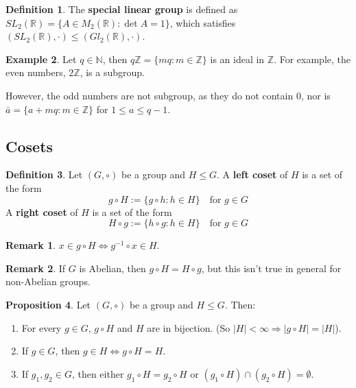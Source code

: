 \documentclass[12pt,a4paper]{article}
\theoremstyle{definition}
\newtheorem{definition}{Definition}[subsection]
\newtheorem{proposition}[definition]{Proposition}
\newtheorem{example}[definition]{Example}
\newtheorem*{remark}{Remark}
\begin{document}
\begin{definition}
	The \textbf{special linear group} is defined as $SL_2(\mathbb{R}) = \{ A \in M_2(\mathbb{R}): \det A = 1 \}$, which satisfies $(SL_2(\mathbb{R}), \cdot) \le (Gl_2(\mathbb{R}), \cdot)$.
\end{definition}

\begin{example}
	Let $q \in \mathbb{N}$, then $q \mathbb{Z} = \{ m q: m \in \mathbb{Z} \}$ is an ideal in $\mathbb{Z}$. For example, the even numbers, $2 \mathbb{Z}$, is a subgroup.

	However, the odd numbers are not subgroup, as they do not contain $0$, nor is $\bar{a} = \{ a + mq: m \in \mathbb{Z} \}$ for $1 \le a \le q - 1$.
\end{example}

\subsection{Cosets}

\begin{definition}
	Let $(G, \circ)$ be a group and $H \le G$. A \textbf{left coset} of $H$ is a set of the form
	\[
		g \circ H := \{ g \circ h: h \in H \} \quad \text{for } g \in G
	\]
	A \textbf{right coset} of $H$ is a set of the form
	\[
		H \circ g := \{ h \circ g: h \in H \} \quad \text{for } g \in G
	\]
\end{definition}

\begin{remark}
	$x \in g \circ H \Longleftrightarrow g^{-1} \circ x \in H$.
\end{remark}

\begin{remark}
	If $G$ is Abelian, then $g \circ H = H \circ g$, but this isn't true in general for non-Abelian groups.
\end{remark}

\begin{proposition}
	Let $(G, \circ)$ be a group and $H \le G$. Then:
	\begin{enumerate}
		\item For every $g \in G$, $g \circ H$ and $H$ are in bijection. (So $|H| < \infty \Rightarrow |g \circ H| = |H|$).
		\item If $g \in G$, then $g \in H \Longleftrightarrow g \circ H = H$.
		\item If $g_1, g_2 \in G$, then either $g_1 \circ H = g_2 \circ H$ or $(g_1 \circ H) \cap (g_2 \circ H) = \emptyset$.
	\end{enumerate}
\end{proposition}
\end{document}
